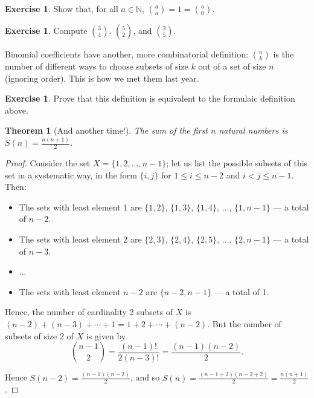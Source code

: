 \documentclass[a4paper,leqno]{article}
\numberwithin{equation}{section}
\newtheorem{thm}[equation]{Theorem}
\theoremstyle{definition}
\newtheorem{exercise}[equation]{Exercise}
\theoremstyle{remark}
\begin{document}
\begin{exercise}
  Show that, for all $ a \in \mathbb{N} $, $ \binom{a}{a} = 1 = \binom{a}{0} $.
\end{exercise}

\begin{exercise}
  Compute $ \binom{3}{4} $, $ \binom{5}{2} $, and $ \binom{2}{5} $.
\end{exercise}

Binomial coefficients have another, more combinatorial definition: $ \binom{n}{k} $ is the number of different ways to choose subsets of size $ k $
out of a set of size $ n $ (ignoring order). This is how we met them last year.

\begin{exercise}
  Prove that this definition is equivalent to the formulaic definition above.
\end{exercise}

\begin{thm}[And another time!]\label{ex:w2}
  The sum of the first $ n $ natural numbers is $ S(n) = \frac{n(n+1)}{2} $.
\end{thm}
\begin{proof}
  Consider the set $ X = \{1, 2, ..., n-1\} $; let us list the possible subsets of this set in a systematic way, in the form $ \{i,j\} $
  for $ 1 \leq i \leq n - 2 $ and $ i < j \leq n - 1 $. Then:
  \begin{itemize}
    \item The sets with least element 1 are $ \{1, 2\} $, $ \{1, 3\} $, $ \{1, 4\} $, ..., $ \{1, n-1\} $ --- a total of $ n - 2 $.
    \item The sets with least element 2 are $ \{2, 3\} $, $ \{2, 4\} $, $ \{2, 5\} $, ..., $ \{2, n-1\} $ --- a total of $ n - 3 $.
    \item ...
    \item The sets with least element $ n - 2 $ are $ \{n - 2, n - 1\} $ --- a total of 1.
  \end{itemize}

  Hence, the number of cardinality 2 subsets of $ X $ is $ (n - 2) + (n - 3) + \cdots + 1 = 1 + 2 + \cdots + (n - 2) $. But the number
  of subsets of size 2 of $ X $ is given by
  \begin{displaymath}
    \binom{n - 1}{2} = \frac{(n - 1)!}{2(n - 3)!} = \frac{(n-1)(n-2)}{2}.
  \end{displaymath}

  Hence $ S(n - 2) = \frac{(n-1)(n-2)}{2} $, and so $ S(n) = \frac{(n - 1 + 2)(n - 2 + 2)}{2} = \frac{n(n+1)}{2} $.
\end{proof}
\end{document}
